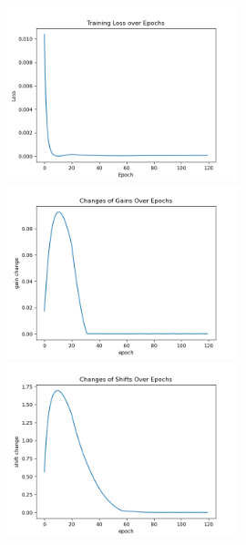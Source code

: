 \documentclass[12pt, a4paper]{article}
\begin{document}
\begin{figure}[H]
    \centering
    \includegraphics[width=0.6\textwidth]{baseline_abb05/fig/0221_abb05_bphebb_loss.png} \\
    \includegraphics[width=0.6\textwidth]{baseline_abb05/fig/0221_abb05_bphebb_gc.png} \\
    \includegraphics[width=0.6\textwidth]{baseline_abb05/fig/0221_abb05_bphebb_sc.png}
\end{figure}
\end{document}

